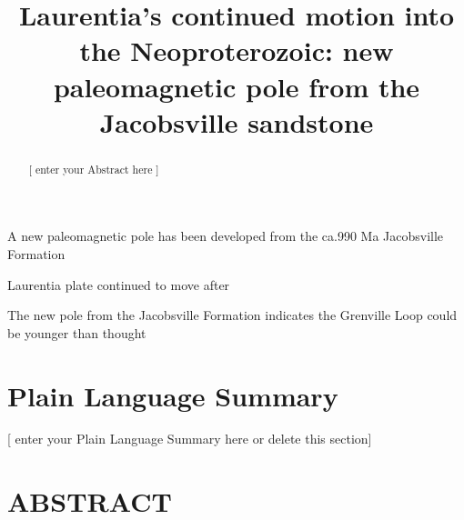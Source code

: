 \documentclass[draft]{agujournal2019}
\begin{document}
\title{Laurentia's continued motion into the Neoproterozoic: new paleomagnetic pole from the Jacobsville sandstone}








\begin{keypoints}
\item A new paleomagnetic pole has been developed from the ca.990 Ma Jacobsville Formation 
\item Laurentia plate continued to move after 
\item The new pole from the Jacobsville Formation indicates the Grenville Loop could be younger than thought
\end{keypoints}


\begin{abstract}
[ enter your Abstract here ]
\end{abstract}

\section*{Plain Language Summary}
[ enter your Plain Language Summary here or delete this section]


\section*{ABSTRACT}
\end{document}
